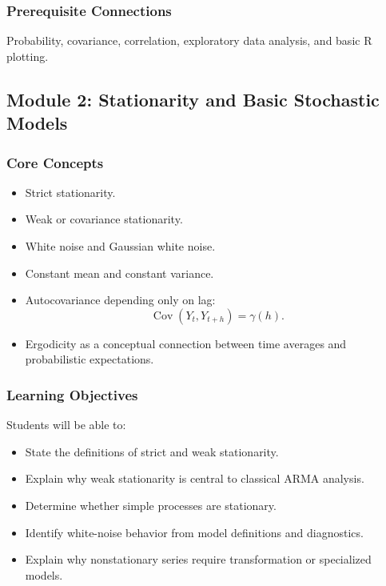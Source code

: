 \documentclass[11pt]{article}
\begin{document}
\subsubsection{Prerequisite Connections}

Probability, covariance, correlation, exploratory data analysis, and basic R
plotting.

\subsection{Module 2: Stationarity and Basic Stochastic Models}

\subsubsection{Core Concepts}

\begin{itemize}
    \item Strict stationarity.
    \item Weak or covariance stationarity.
    \item White noise and Gaussian white noise.
    \item Constant mean and constant variance.
    \item Autocovariance depending only on lag:
    \[
    \operatorname{Cov}(Y_t,Y_{t+h}) = \gamma(h).
    \]
    \item Ergodicity as a conceptual connection between time averages and
    probabilistic expectations.
\end{itemize}

\subsubsection{Learning Objectives}

Students will be able to:

\begin{itemize}
    \item State the definitions of strict and weak stationarity.
    \item Explain why weak stationarity is central to classical ARMA analysis.
    \item Determine whether simple processes are stationary.
    \item Identify white-noise behavior from model definitions and diagnostics.
    \item Explain why nonstationary series require transformation or specialized
    models.
\end{itemize}
\end{document}
